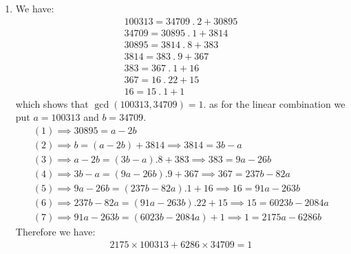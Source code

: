 \begin{enumerate}[label=]
    \item 
        We have:
        \begin{gather}
            100313 = 34709 \ . \ 2 + 30895 \\
            34709 = 30895 \ . \ 1 + 3814 \\
            30895 = 3814 \ . \ 8 + 383 \\
            3814 = 383 \ . \ 9 + 367 \\
            383 = 367 \ . \ 1 + 16 \\
            367 = 16 \ . \ 22 + 15 \\
            16 = 15 \ . \ 1 + 1
        \end{gather}
        which shows that $\gcd(100313, 34709) = 1$.
        as for the linear combination we put $a = 100313$ and $b = 34709$.
        \begin{gather*}
            (1) \implies 30895 = a - 2b \\
            (2) \implies b = (a - 2b) + 3814 \implies 3814 = 3b - a \\
            (3) \implies a - 2b = (3b - a).8 + 383 \implies 383 = 9a - 26b \\
            (4) \implies 3b - a = (9a - 26b).9 + 367 \implies 367 = 237b - 82a \\
            (5) \implies 9a - 26b = (237b - 82a).1 + 16 \implies 16 = 91a - 263b \\
            (6) \implies 237b - 82a = (91a - 263b).22 + 15 \implies 15 = 6023b - 2084a\\
            (7) \implies 91a - 263b = (6023b - 2084a) + 1 \implies 1 = 2175a - 6286b  
        \end{gather*}
        Therefore we have:
        \begin{gather*}
            2175 \times 100313 + 6286 \times 34709 = 1
        \end{gather*}
        
\end{enumerate}